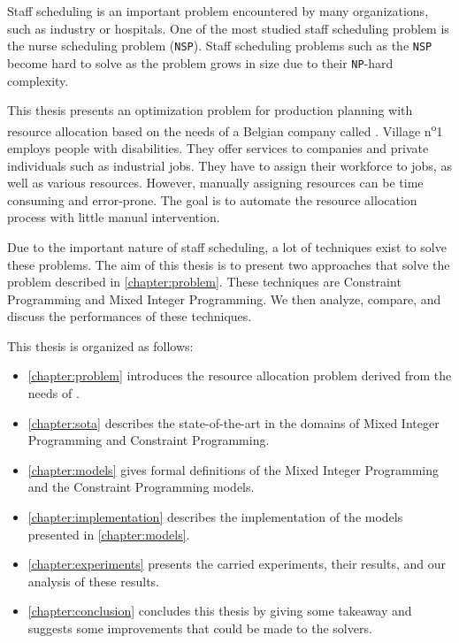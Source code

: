 \documentclass[../thesis.tex]{subfiles}
\begin{document}
Staff scheduling is an important problem encountered by many organizations, such as industry or hospitals.
One of the most studied staff scheduling problem is the nurse scheduling problem (\texttt{NSP}). 
Staff scheduling problems such as the \texttt{NSP} become hard to solve as the problem grows in size due to their \texttt{NP}-hard complexity.

This thesis presents an optimization problem for production planning with resource allocation based on the needs of a Belgian company called \vone.
Village n\textsuperscript{o}1 employs people with disabilities.
They offer services to companies and private individuals such as industrial jobs. They have to assign their 
workforce to jobs, as well as various resources. However, manually assigning resources can be time consuming and error-prone.
The goal is to automate the resource allocation process with little manual intervention.

Due to the important nature of staff scheduling, a lot of techniques exist to solve these problems. 
The aim of this thesis is to present two approaches that solve the problem described 
in \autoref{chapter:problem}. These techniques are Constraint Programming and Mixed Integer Programming.
We then analyze, compare, and discuss the performances of these techniques.



This thesis is organized as follows:

\begin{itemize}
  \item[] \autoref{chapter:problem} introduces the resource allocation problem derived from the needs of \vone.
  \item[] \autoref{chapter:sota} describes the state-of-the-art in the domains of Mixed Integer Programming and Constraint Programming. 
  \item[] \autoref{chapter:models} gives formal definitions of the Mixed Integer Programming and the Constraint Programming models.
  \item[] \autoref{chapter:implementation} describes the implementation of the models presented in \autoref{chapter:models}.
  \item[] \autoref{chapter:experiments} presents the carried experiments, their results, and our analysis of these results.
  \item[] \autoref{chapter:conclusion} concludes this thesis by giving some takeaway and suggests some improvements that could be made to the solvers.
\end{itemize}
\end{document}
